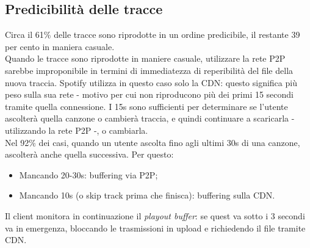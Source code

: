 \subsection{Predicibilità delle tracce}
Circa il 61\% delle tracce sono riprodotte in un ordine predicibile, il restante 39 per cento in maniera casuale. \\
Quando le tracce sono riprodotte in maniere casuale, utilizzare la rete P2P sarebbe improponibile in termini di immediatezza di reperibilità del file della nuova traccia. Spotify utilizza in questo caso solo la CDN: questo significa più peso sulla sua rete - motivo per cui non riproducono più dei primi 15 secondi tramite quella connessione. I 15s sono sufficienti per determinare se l'utente ascolterà quella canzone o cambierà traccia, e quindi continuare a scaricarla - utilizzando la rete P2P -, o cambiarla. \\
Nel 92\% dei casi, quando un utente ascolta fino agli ultimi 30s di una canzone, ascolterà anche quella successiva. Per questo:
\begin{itemize}
    \item Mancando 20-30s: buffering via P2P;
    \item Mancando 10s (o skip track prima che finisca): buffering sulla CDN.
\end{itemize}
Il client monitora in continuazione il \textit{playout buffer}: se quest va sotto i 3 secondi va in emergenza, bloccando le trasmissioni in upload e richiedendo il file tramite CDN.